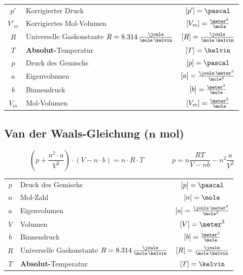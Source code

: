 \renewcommand{\arraystretch}{1.3}
\begin{tabular}{c l c}
	$p'$ 	& Korrigierter Druck 														& $[p'] = \pascal$ 								\\
	$V'_m$ 	& Korrigiertes Mol-Volumen 													& $[V_m] = \frac{\meter^3}{\mole}$ 				\\
	$R$		& Universelle Gaskonstante $R = 8.314 \, \frac{\joule}{\mole \, \kelvin}$ 	& $[R] = \frac{\joule}{\mole \, \kelvin}$ 		\\
	$T$ 	& \textbf{Absolut-}Temperatur		 										& $[T] = \kelvin$ 								\\
	$p$ 	& Druck des Gemischs 														& $[p] = \pascal$ 								\\
	$a$ 	& Eigenvolumen 																& $[a] = \frac{\joule \, \meter^3}{\mole^2}$ 	\\
	$b$ 	& Binnendruck 																& $[b] = \frac{\meter^3}{\mole}$ 				\\
	$V_m$ 	& Mol-Volumen 																& $[V_m] = \frac{\meter^3}{\mole}$
\end{tabular}
\renewcommand{\arraystretch}{1}


\subsection[Van der Waals-Gleichung (n Mol)]{Van der Waals-Gleichung ($\bm{n}$ mol)}

\vspace{-0.2cm}

$$ \boxed{ \left( p + \frac{n^2 \cdot a}{V^2} \right)  \cdot (V - n \cdot b) = n \cdot R 
\cdot T } \qquad \qquad \boxed{p = n\frac{RT}{V-nb} - n^2 \frac{a}{V^2}}$$

\renewcommand{\arraystretch}{1.3}
\begin{tabular}{c l c}
	$p$ & Druck des Gemischs 															& $[p] = \pascal$ 								\\
	$n$ & Mol-Zahl 																		& $[n] = \mole$ 								\\
	$a$ & Eigenvolumen 																	& $[a] = \frac{\joule \, \meter^3}{\mole^2}$ 	\\
	$V$ & Volumen 																		& $[V] = \meter^3$ 								\\
	$b$ & Binnendruck 																	& $[b] = \frac{\meter^3}{\mole}$ 				\\
	$R$	& Universelle Gaskonstante $R = 8.314 \, \frac{\joule}{\mole \, \kelvin}$ 		& $[R] = \frac{\joule}{\mole \, \kelvin}$ 		\\
	$T$ & \textbf{Absolut-}Temperatur 													& $[T] = \kelvin$
\end{tabular}
\renewcommand{\arraystretch}{1}


